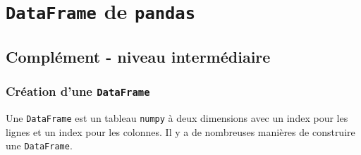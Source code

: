     
    
    
    

    

    \hypertarget{dataframe-de-pandas}{%
\section{\texorpdfstring{\texttt{DataFrame} de
\texttt{pandas}}{DataFrame de pandas}}\label{dataframe-de-pandas}}

    \hypertarget{compluxe9ment---niveau-intermuxe9diaire}{%
\subsection{Complément - niveau
intermédiaire}\label{compluxe9ment---niveau-intermuxe9diaire}}

    \hypertarget{cruxe9ation-dune-dataframe}{%
\subsubsection{\texorpdfstring{Création d'une
\texttt{DataFrame}}{Création d'une DataFrame}}\label{cruxe9ation-dune-dataframe}}

    Une \texttt{DataFrame} est un tableau \texttt{numpy} à deux dimensions
avec un index pour les lignes et un index pour les colonnes. Il y a de
nombreuses manières de construire une \texttt{DataFrame}.

